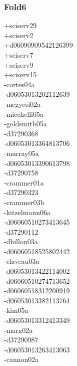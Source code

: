 \begin{multicols}{3}
\subsubsection*{Fold6}
+sciserv29\\
+sciserv2\\
+d06090909542126399\\
+sciserv7\\
+sciserv9\\
+sciserv15\\
-cortes04a\\
-d06053013202112639\\
-megyesi02a\\
-micchelli05a\\
-goldsmith05a\\
-d37290368\\
-d06053013364813706\\
-murray05a\\
-d06053013390613798\\
-d37290758\\
-crammer01a\\
-d37290323\\
-crammer03b\\
-kitzelmann06a\\
-d06060510273413645\\
-d37290112\\
-dhillon03a\\
-d06060518525802442\\
-claveau03a\\
-d06053013422114002\\
-d06060510274713652\\
-d06060518312200919\\
-d06053013382113764\\
-kim05a\\
-d06053013312413349\\
-marx02a\\
-d37290987\\
-d06053013263413063\\
-cannon02a\\

\end{multicols}
